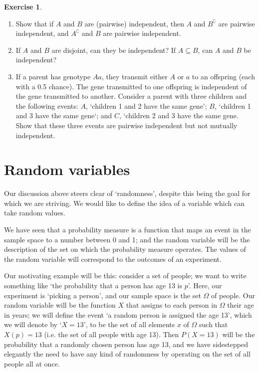 \documentclass[a4paper,leqno]{article}
\numberwithin{equation}{section}
\theoremstyle{definition}
\newtheorem{exercise}[equation]{Exercise}
\theoremstyle{remark}
\begin{document}
\begin{exercise}\leavevmode
  \begin{enumerate}
    \item Show that if $ A $ and $ B $ are (pairwise) independent, then $ A $ and $ B^\complement $ are pairwise independent,
          and $ A^\complement $ and $ B $ are pairwise independent.
    \item If $ A $ and $ B $ are disjoint, can they be independent? If $ A \subseteq B $, can $ A $ and $ B $ be independent?
    \item If a parent has genotype $ Aa $, they transmit either $ A $ or $ a $ to an offspring (each with a 0.5 chance). The gene
          transmitted to one offspring is independent of the gene transmitted to another. Consider a parent with three children
          and the following events: $ A $, `children 1 and 2 have the same gene'; $ B $, `children 1 and 3 have the same gene`;
          and $ C $, `children 2 and 3 have the same gene. Show that these three events are pairwise independent but not mutually
          independent.
  \end{enumerate}
\end{exercise}

\section{Random variables}
Our discussion above steers clear of `randomness', despite this being the goal for which we are striving. We would like to define
the idea of a variable which can take random values.

We have seen that a probability measure is a function that maps an event in the sample space to a number between 0 and 1; and the random
variable will be the description of the set on which the probability measure operates. The values of the random variable will correspond
to the outcomes of an experiment.

Our motivating example will be this: consider a set of people; we want to write something like `the probability that a person has age 13
is $ p $'. Here, our experiment is `picking a person', and our sample space is the set $ \Omega $ of people. Our random variable will
be the function $ X $ that assigns to each person in $ \Omega $ their age in years; we will define the event `a random person is assigned
the age 13', which we will denote by `$ X = 13 $', to be the set of all elements $ x $ of $ \Omega $ such that $ X(p) = 13 $ (i.e. the
set of all people with age 13). Then $ P(X = 13) $ will be the probability that a randomly chosen person has age 13, and we have sidestepped
elegantly the need to have any kind of randomness by operating on the set of all people all at once.
\end{document}
